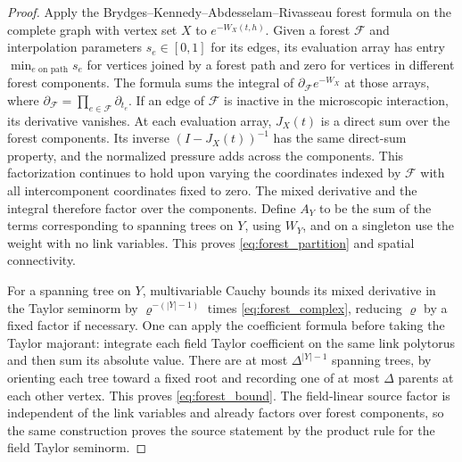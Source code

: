 \documentclass[11pt]{article}
\begin{document}
\begin{proof}
Apply the Brydges--Kennedy--Abdesselam--Rivasseau forest formula
\cite{AR} on the complete graph with vertex set \(X\) to
\(e^{-W_X(t,h)}\). Given a forest \(\mathcal F\) and interpolation
parameters \(s_e\in[0,1]\) for its edges, its evaluation array has
entry \(\min_{e\text{ on path}}s_e\) for vertices joined by a forest
path and zero for vertices in different forest components.
The formula sums the integral of \(\partial_{\mathcal F}e^{-W_X}\)
at those arrays, where \(\partial_{\mathcal F}=\prod_{e\in\mathcal F}\partial_{t_e}\).
If an edge of \(\mathcal F\) is inactive in the microscopic
interaction, its derivative vanishes. At each evaluation array,
\(J_X(t)\) is a direct sum over the forest components. Its
inverse \((I-J_X(t))^{-1}\) has the same direct-sum property,
and the normalized pressure adds across the components.
This factorization continues to hold upon varying the
coordinates indexed by \(\mathcal F\) with all intercomponent
coordinates fixed to zero. The mixed derivative and the integral
therefore factor over the components. Define \(A_Y\) to be the sum
of the terms corresponding to spanning trees on \(Y\), using
\(W_Y\), and on a singleton use the weight with no link variables.
This proves \eqref{eq:forest_partition} and spatial connectivity.

For a spanning tree on \(Y\), multivariable Cauchy bounds its
mixed derivative in the Taylor seminorm by \(\varrho^{-(|Y|-1)}\)
times \eqref{eq:forest_complex}, reducing \(\varrho\) by a fixed
factor if necessary. One can apply the coefficient formula
before taking the Taylor majorant: integrate each field Taylor
coefficient on the same link polytorus and then sum its absolute
value. There are at most \(\Delta^{|Y|-1}\) spanning trees,
by orienting each tree toward a fixed root and recording one
of at most \(\Delta\) parents at each other vertex. This proves
\eqref{eq:forest_bound}. The field-linear source factor is
independent of the link variables and already factors over
forest components, so the same construction proves the source
statement by the product rule for the field Taylor seminorm.
\end{proof}
\end{document}
